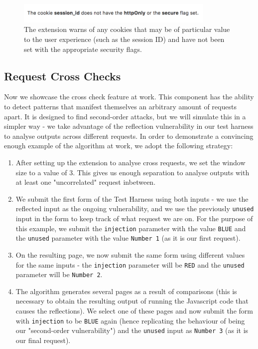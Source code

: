 \begin{figure}[h!]
	\centering
	\includegraphics[width=0.85\textwidth]{images/cookie_warning.png}
	\caption{The extension warns of any cookies that may be of particular value to the user experience (such as the session ID) and have not been set with the appropriate security flags.}
	\label{fig:cookie_warning}
\end{figure}



\subsection{Request Cross Checks}

Now we showcase the cross check feature at work. This component has the ability to detect patterns that manifest themselves an arbitrary amount of requests apart. It is designed to find second-order attacks, but we will simulate this in a simpler way - we take advantage of the reflection vulnerability in our test harness to analyse outputs across different requests. In order to demonstrate a convincing enough example of the algorithm at work, we adopt the following strategy:

\begin{enumerate}
	\item After setting up the extension to analyse cross requests, we set the window size to a value of 3. This gives us enough separation to analyse outputs with at least one "uncorrelated" request inbetween.
	
	\item We submit the first form of the Test Harness using both inputs - we use the reflected input as the ongoing vulnerability, and we use the previously \texttt{unused} input in the form to keep track of what request we are on. For the purpose of this example, we submit the \texttt{injection} parameter with the value \texttt{BLUE} and the \texttt{unused} parameter with the value \texttt{Number 1} (as it is our first request).
	
	\item On the resulting page, we now submit the same form using different values for the same inputs - the \texttt{injection} parameter will be \texttt{RED} and the \texttt{unused} parameter will be \texttt{Number 2}.
	
	\item The algorithm generates several pages as a result of comparisons (this is necessary to obtain the resulting output of running the Javascript code that causes the reflections). We select one of these pages and now submit the form with \texttt{injection} to be \texttt{BLUE} again (hence replicating the behaviour of being our "second-order vulnerability") and the \texttt{unused} input as \texttt{Number 3} (as it is our final request).
\end{enumerate}

